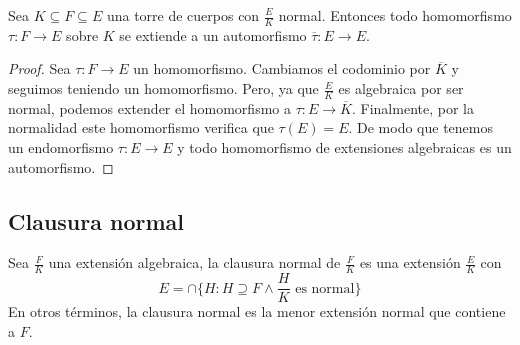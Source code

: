 \begin{theorem}
Sea $K \subseteq F \subseteq E$ una torre de cuerpos con $\frac{E}{K}$ normal. Entonces todo homomorfismo $\tau:F \to E$ sobre $K$ se extiende a un automorfismo $\overline{\tau}:E \to E$. 
\end{theorem}
\begin{proof}
Sea $\tau:F \to E$ un homomorfismo. Cambiamos el codominio por $\overline{K}$ y seguimos teniendo un homomorfismo. Pero, ya que $\frac{E}{K}$ es algebraica por ser normal, podemos extender el homomorfismo a $\tau:E \to \overline{K}$. Finalmente, por la normalidad este homomorfismo verifica que $\tau(E) = E$. De modo que tenemos un endomorfismo $\tau:E \to E$ y todo homomorfismo de extensiones algebraicas es un automorfismo.
\end{proof}

\subsection{Clausura normal}

\begin{definition}
Sea $\frac{F}{K}$ una extensión algebraica, la clausura normal de $\frac{F}{K}$ es una extensión $\frac{E}{K}$ con $$E = \cap \{H:H \supseteq F \land \frac{H}{K} \text{ es normal}\}$$ En otros términos, la clausura normal es la menor extensión normal que contiene a $F$.
\end{definition}

